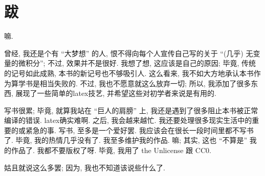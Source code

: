\chapter{跋}

嘛.

曾经, 我还是个有 ``大梦想'' 的人,
恨不得向每个人宣传自己写的关于 ``(几乎) 无变量的微积分'';
不过, 效果并不是很好.
我想了想, 这应该是自己的原因;
毕竟, 传统的记号如此成熟, 本书的新记号也不够吸引人.
这么看来, 我不如大方地承认本书作为算学书是相当失败的.
不过, 我也不愿意就这么放弃一切;
所以, 我添加了很多东西, 展现了一些简单的\gls{latex}技艺,
并希望这些对初学者来说是有用的.

写书很累;
毕竟, 就算我站在 ``巨人的肩膀'' 上,
我还是遇到了很多阻止本书被正常编译的错误.
\gls{latex}确实难啊.
之后, 我会越来越忙.
我还要处理很多现实生活中的重要的或紧急的事.
写书, 至多是一个爱好罢.
我应该会在很长一段时间里都不写书了.
毕竟, 我的热情几乎没有了.
我至多维护我的作品.
嘛; 其实, 这也 ``不算是'' 我的作品了.
我都不要版权了呀.
毕竟, 我用了 the Unlicense 跟 CC0.

姑且就说这么多罢;
因为, 我也不知道该说些什么了.

\begin{flushright}
    \theauthor\\
    \thedate
\end{flushright}

